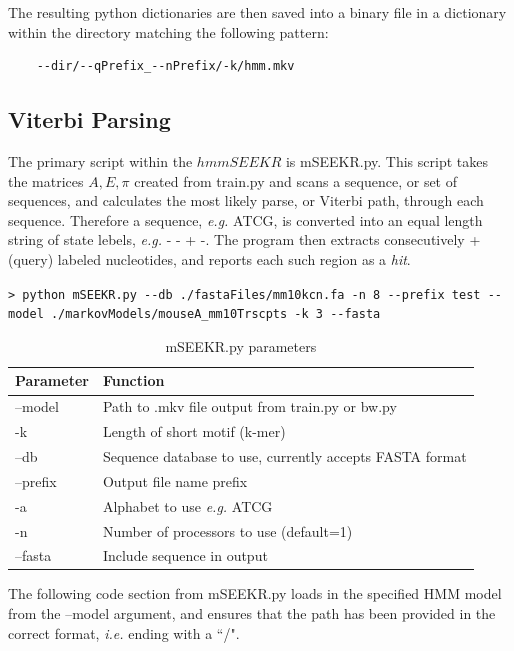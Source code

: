 
The resulting python dictionaries are then saved into a binary file in a dictionary within the directory matching the following pattern:

\begin{verbatim}
    --dir/--qPrefix_--nPrefix/-k/hmm.mkv
\end{verbatim}
\subsection{Viterbi Parsing}
The primary script within the $hmmSEEKR$ is mSEEKR.py. This script takes the matrices $A,E,\pi$ created from train.py and scans a sequence, or set of sequences, and calculates the most likely parse, or Viterbi path, through each sequence. Therefore a sequence, \emph{e.g.} ATCG, is converted into an equal length string of state lebels, \emph{e.g.} - - + -. The program then extracts consecutively + (query) labeled nucleotides, and reports each such region as a \emph{hit}. 

\lstinline{> python mSEEKR.py --db ./fastaFiles/mm10kcn.fa -n 8 --prefix test --model ./markovModels/mouseA_mm10Trscpts -k 3 --fasta}

\begin{table}[h]
\centering
 \begin{tabular}{|l l|}
 \hline
 Parameter & Function\\
 \hline
 --model & Path to .mkv file output from train.py or bw.py \\
 -k & Length of short motif (k-mer) \\
 --db & Sequence database to use, currently accepts FASTA format\\
 --prefix & Output file name prefix \\
 -a & Alphabet to use \emph{e.g.} ATCG \\
 -n & Number of processors to use (default=1)\\
 --fasta & Include sequence in output \\
 \hline
 
\end{tabular}
\caption{mSEEKR.py parameters}
\label{tab:viterbiparams}
\end{table}

The following code section from mSEEKR.py loads in the specified HMM model from the --model argument, and ensures that the path has been provided in the correct format, \emph{i.e.} ending with a ``/". 


